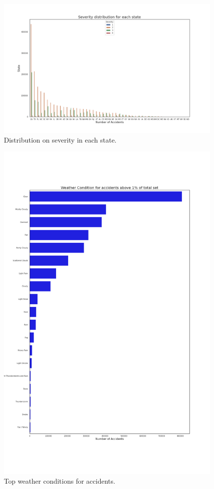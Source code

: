 \documentclass[../main.tex]{subfiles}
\begin{document}
\begin{figure}[H]
\centering
\includegraphics[width=15cm]{Images/severity_dist_class_state.png}
\caption{Distribution on severity in each state.}
\label{fig:severity_dist_class}
\end{figure}

\begin{figure}[H]
\centering
\includegraphics[width=15cm]{Images/weather_cond_dist.png}
\caption{Top weather conditions for accidents.}
\label{fig:weather_cond_dist}
\end{figure}
\end{document}
